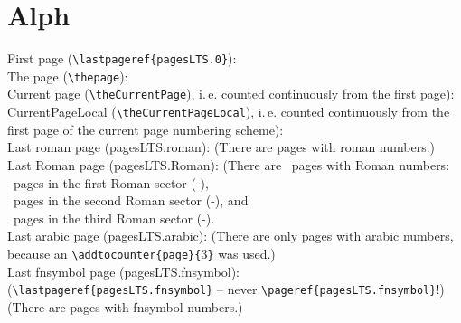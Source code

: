 \documentclass[british]{article}
\def\pagesLTSexampleArabic{3}
\begin{document}
\newpage


\section{Alph}

\noindent First page (\verb|\lastpageref{pagesLTS.0}|):
 \\

\noindent The page (\verb|\thepage|): \thepage \\

\noindent Current page (\verb|\theCurrentPage|),
i.\,e. counted continuously from the first page): \theCurrentPage \\

\noindent CurrentPageLocal (\verb|\theCurrentPageLocal|),
i.\,e. counted continuously from the first page of the
current page numbering scheme): \theCurrentPageLocal \\

\noindent Last roman page (pagesLTS.roman): 
(There are  pages with roman numbers.)\\

\noindent Last Roman page (pagesLTS.Roman): 
(There are ~pages with Roman numbers:\\
~pages in the first Roman sector
(\pageref{Roman}{\hskip3em }-),\\
~pages in the second Roman sector
(\pageref{Roman2}{\hskip3em }-), and\\
~pages in the third Roman sector
(\pageref{Roman3}{\hskip3em }-).\\

\noindent Last arabic page (pagesLTS.arabic): 
(There are only  pages with arabic numbers,
because an \verb|\addtocounter{page}{|\pagesLTSexampleArabic\verb|}| was used.)\\

\noindent Last fnsymbol page (pagesLTS.fnsymbol):  \\
(\verb|\lastpageref{pagesLTS.fnsymbol}| -- never \verb|\pageref{pagesLTS.fnsymbol}|!)\\
(There are  pages with fnsymbol numbers.)\\
\end{document}

